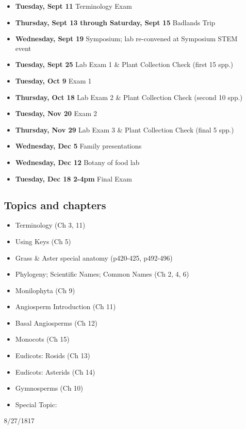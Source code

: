 \documentclass{tufte-handout}
\begin{document}
\begin{fullwidth}
\begin{itemize}
	\item \textbf{Tuesday, Sept 11} Terminology Exam
	\item \textbf{Thursday, Sept 13 through Saturday, Sept 15} Badlands Trip
	\item \textbf{Wednesday, Sept 19} Symposium; lab re-convened at Symposium STEM event
	\item \textbf{Tuesday, Sept 25} Lab Exam 1 \& Plant Collection Check (first 15 spp.)
	\item \textbf{Tuesday, Oct 9} Exam 1
	\item \textbf{Thursday, Oct 18} Lab Exam 2 \& Plant Collection Check (second 10 spp.)
	\item \textbf{Tuesday, Nov 20} Exam 2
	\item \textbf{Thursday, Nov 29} Lab Exam 3 \& Plant Collection Check (final 5 spp.)
	\item \textbf{Wednesday, Dec 5} Family presentations
	\item \textbf{Wednesday, Dec 12} Botany of food lab
	\item \textbf{Tuesday, Dec 18 2-4pm} Final Exam
\end{itemize}

\subsection{Topics and chapters}

\begin{itemize}
	\item Terminology (Ch 3, 11)
	\item Using Keys (Ch 5)
	\item Grass \& Aster special anatomy (p420-425, p492-496)
	\item Phylogeny; Scientific Names; Common Names (Ch 2, 4, 6)
	\item Monilophyta (Ch 9)
	\item Angiosperm Introduction (Ch 11)
	\item Basal Angiosperms (Ch 12)
	\item Monocots (Ch 15)
	\item Eudicots: Rosids (Ch 13)
	\item Eudicots: Asterids (Ch 14)
	\item Gymnosperms (Ch 10)
	\item Special Topic: 
\end{itemize}

\newpage
  \setlength{\calwidth}{6.5in}
  \setlength{\calboxdepth}{0.20in}
  \begin{calendar}{8/27/18}{17}


\end{calendar}
\end{fullwidth}
\end{document}
